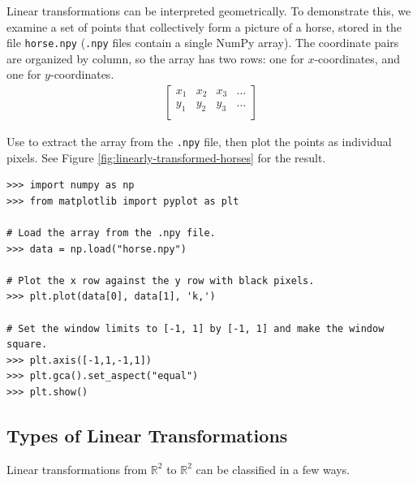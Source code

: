 Linear transformations can be interpreted geometrically.
To demonstrate this, we examine a set of points that collectively form a picture of a horse, stored in the file \texttt{horse.npy} (\texttt{.npy} files contain a single NumPy array).
The coordinate pairs are organized by column, so the array has two rows: one for $x$-coordinates, and one for $y$-coordinates.
%
\begin{align*}
\left[\begin{array}{cccc}
x_1 & x_2 & x_3 & \ldots \\
y_1 & y_2 & y_3 & \ldots \\
\end{array}\right]
\end{align*}

Use 
to extract the array from the \texttt{.npy} file, then plot the points as individual pixels.
See Figure \ref{fig:linearly-transformed-horses} for the result.

\begin{lstlisting}
>>> import numpy as np
>>> from matplotlib import pyplot as plt

# Load the array from the .npy file.
>>> data = np.load("horse.npy")

# Plot the x row against the y row with black pixels.
>>> plt.plot(data[0], data[1], 'k,')

# Set the window limits to [-1, 1] by [-1, 1] and make the window square.
>>> plt.axis([-1,1,-1,1])
>>> plt.gca().set_aspect("equal")
>>> plt.show()
\end{lstlisting}

\subsection*{Types of Linear Transformations} %

Linear transformations from $\mathbb{R}^2$ to $\mathbb{R}^2$ can be classified in a few ways.

